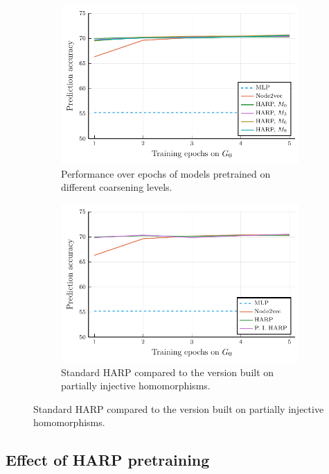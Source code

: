 \begin{figure}
  \centering
  \begin{subfigure}[t]{0.49\textwidth}
    \centering
    \includegraphics[width=\textwidth]{images/steps_accur/steps_accur.pdf}
    \caption{Performance over epochs of models pretrained on different coarsening levels.}\label{fig:steps-accuracy}
  \end{subfigure}
  \begin{subfigure}[t]{0.49\textwidth}
    \centering
    \includegraphics[width=\textwidth]{images/pihom_comparison/pihom_comparison.pdf}
    \caption{Standard HARP compared to the version built on partially injective homomorphisms.}\label{fig:HARP-vs-PIHom}
  \end{subfigure}
\end{figure}

\subsection{Effect of HARP pretraining}

